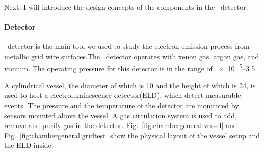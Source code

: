 Next, I will introduce the design concepts of the components in the \gtest\ detector.

\paragraph{Detector}
\gtest\ detector is the main tool we used to study the electron emission process from metallic grid wire surfaces.The \gtest\ detector operates with xenon gas, argon gas, and vacuum. The operating pressure for this detector is in the range of \SIrange{e-5}{3.5}{\bara}. 

A cylindrical vessel, the diameter of which is \SI{10}{\inch} and the height of which is \SI{24}{\inch}, is used to host a electroluminescence detector(ELD), which detect measurable events. The pressure and the temperature of the detector are monitored by sensors mounted above the vessel. A gas circulation system is used to add, remove and purify gas in the detector. Fig.~\ref{fig:chambergeneral:vessel} and Fig.~\ref{fig:chambergeneral:gridtest} show the physical layout of the vessel setup and the ELD inside. 

